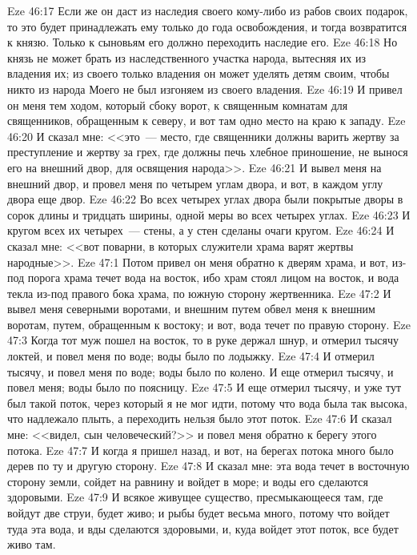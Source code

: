\vs Eze 46:17 Если же он даст из наследия своего кому-либо из рабов своих подарок, то это будет принадлежать ему только до года освобождения, и тогда возвратится к князю. Только к сыновьям его должно переходить наследие его.
\vs Eze 46:18 Но князь не может брать из наследственного участка народа, вытесняя их из владения их; из своего только владения он может уделять детям своим, чтобы никто из народа Моего не был изгоняем из своего владения.
\vs Eze 46:19 И привел он меня тем ходом, который сбоку ворот, к священным комнатам для священников, обращенным к северу, и вот там одно место на краю к западу.
\vs Eze 46:20 И сказал мне: <<это~--- место, где священники должны варить жертву за преступление и жертву за грех, где должны печь хлебное приношение, не вынося его на внешний двор, для освящения народа>>.
\vs Eze 46:21 И вывел меня на внешний двор, и провел меня по четырем углам двора, и вот, в каждом углу двора еще двор.
\vs Eze 46:22 Во всех четырех углах двора были покрытые дворы в сорок  длины и тридцать ширины, одной меры во всех четырех углах.
\vs Eze 46:23 И кругом всех их четырех~--- стены, а у стен сделаны очаги кругом.
\vs Eze 46:24 И сказал мне: <<вот поварни, в которых служители храма варят жертвы народные>>.
\vs Eze 47:1 Потом привел он меня обратно к дверям храма, и вот, из-под порога храма течет вода на восток, ибо храм стоял лицом на восток, и вода текла из-под правого бока храма, по южную сторону жертвенника.
\vs Eze 47:2 И вывел меня северными воротами, и внешним путем обвел меня к внешним воротам, путем, обращенным к востоку; и вот, вода течет по правую сторону.
\vs Eze 47:3 Когда тот муж пошел на восток, то в руке держал шнур, и отмерил тысячу локтей, и повел меня по воде; воды было по лодыжку.
\vs Eze 47:4 И  отмерил тысячу, и повел меня по воде; воды было по колено. И еще отмерил тысячу, и повел меня; воды было по поясницу.
\vs Eze 47:5 И еще отмерил тысячу, и уже тут был такой поток, через который я не мог идти, потому что вода была так высока, что надлежало плыть, а переходить нельзя было этот поток.
\vs Eze 47:6 И сказал мне: <<видел, сын человеческий?>> и повел меня обратно к берегу этого потока.
\vs Eze 47:7 И когда я пришел назад, и вот, на берегах потока много было дерев по ту и другую сторону.
\vs Eze 47:8 И сказал мне: эта вода течет в восточную сторону земли, сойдет на равнину и войдет в море; и воды его сделаются здоровыми.
\vs Eze 47:9 И всякое живущее существо, пресмыкающееся там, где войдут две струи, будет живо; и рыбы будет весьма много, потому что войдет туда эта вода, и вды  сделаются здоровыми, и, куда войдет этот поток, все будет живо там.
